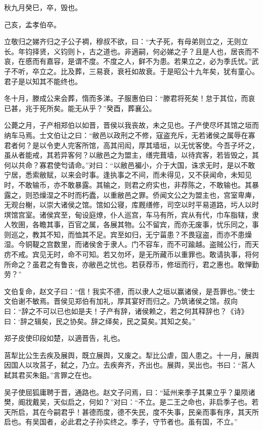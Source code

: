 \documentclass[a4paper,12pt,UTF8,twoside]{ctexbook}
\begin{document}
秋九月癸巳，卒，毁也。

己亥，孟孝伯卒。

立敬归之娣齐归之子公子裯，穆叔不欲，曰：“大子死，有母弟则立之，无则立长。年钧择贤，义钧则卜，古之道也。非適嗣，何必娣之子？且是人也，居丧而不哀，在慼而有嘉容，是谓不度。不度之人，鲜不为患。若果立之，必为季氏忧。”武子不听，卒立之。比及葬，三易衰，衰衽如故衰。于是昭公十九年矣，犹有童心。君子是以知其不能终也。

冬十月，滕成公来会葬，惰而多涕。子服惠伯曰：“滕君将死矣！怠于其位，而哀已甚，兆于死所矣。能无从乎？”癸酉，葬襄公。

公薨之月，子产相郑伯以如晋，晋侯以我丧故，未之见也。子产使尽坏其馆之垣而纳车马焉。士文伯让之曰：“敝邑以政刑之不修，寇盗充斥，无若诸侯之属辱在寡君者何？是以令吏人完客所馆，高其闬闳，厚其墙垣，以无忧客使。今吾子坏之，虽从者能戒，其若异客何？以敝邑之为盟主，缮完葺墙，以待宾客，若皆毁之，其何以共命？寡君使匄请命。”对曰：“以敝邑褊小，介于大国，诛求无时，是以不敢宁居，悉索敝赋，以来会时事。逢执事之不间，而未得见，又不获闻命，未知见时，不敢输币，亦不敢暴露。其输之，则君之府实也，非荐陈之，不敢输也。其暴露之，则恐燥湿之不时而朽蠹，以重敝邑之罪。侨闻文公之为盟主也，宫室卑庳，无观台榭，以崇大诸侯之馆。馆如公寝，库厩缮修，司空以时平易道路，圬人以时塓馆宫室。诸侯宾至，甸设庭燎，仆人巡宫，车马有所，宾从有代，巾车脂辖，隶人牧圉，各瞻其事，百官之属，各展其物。公不留宾，而亦无废事，忧乐同之，事则巡之，教其不知，而恤其不足。宾至如归，无宁菑患？不畏寇盗，而亦不患燥湿。今铜鞮之宫数里，而诸侯舍于隶人。门不容车，而不可踰越。盗贼公行，而天疠不戒。宾见无时，命不可知。若又勿坏，是无所藏币以重罪也。敢请执事，将何所命之？虽君之有鲁丧，亦敝邑之忧也。若获荐币，修垣而行，君之惠也。敢惮勤劳？”

文伯复命，赵文子曰：“信！我实不德，而以隶人之垣以赢诸侯，是吾罪也。”使士文伯谢不敏焉。晋侯见郑伯有加礼，厚其宴好而归之。乃筑诸侯之馆。叔向曰：“辞之不可以已也如是夫！子产有辞，诸侯赖之，若之何其释辞也？《诗》曰：‘辞之辑矣，民之协矣。辞之绎矣，民之莫矣。’其知之矣。”

郑子皮使印段如楚，以適晋告，礼也。

莒犁比公生去疾及展舆，既立展舆，又废之。犁比公虐，国人患之。十一月，展舆因国人以攻莒子，弑之，乃立。去疾奔齐，齐出也。展舆，吴出也。书曰：“莒人弑其君买朱鉏。”言罪之在也。

吴子使屈狐庸聘于晋，通路也。赵文子问焉，曰：“延州来季子其果立乎？巢陨诸樊，阍戕戴吴，天似启之，何如？”对曰：“不立。是二王之命也，非启季子也。若天所启，其在今嗣君乎！甚德而度，德不失民，度不失事，民亲而事有序，其天所启也。有吴国者，必此君之子孙实终之。季子，守节者也。虽有国，不立。”
\end{document}
